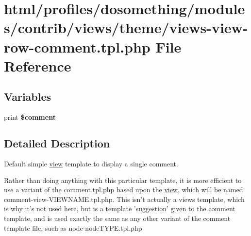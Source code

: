 \hypertarget{views-view-row-comment_8tpl_8php}{
\section{html/profiles/dosomething/modules/contrib/views/theme/views-\/view-\/row-\/comment.tpl.php File Reference}
\label{views-view-row-comment_8tpl_8php}
}
\subsection*{Variables}
\begin{DoxyCompactItemize}
\item 
\hypertarget{views-view-row-comment_8tpl_8php_ac19d822a3ba2e8342528829eca49eb2e}{
print {\bfseries \$comment}}
\label{views-view-row-comment_8tpl_8php_ac19d822a3ba2e8342528829eca49eb2e}

\end{DoxyCompactItemize}


\subsection{Detailed Description}
Default simple \hyperlink{classview}{view} template to display a single comment.

Rather than doing anything with this particular template, it is more efficient to use a variant of the comment.tpl.php based upon the \hyperlink{classview}{view}, which will be named comment-\/view-\/VIEWNAME.tpl.php. This isn't actually a views template, which is why it's not used here, but is a template 'suggestion' given to the comment template, and is used exactly the same as any other variant of the comment template file, such as node-\/nodeTYPE.tpl.php 